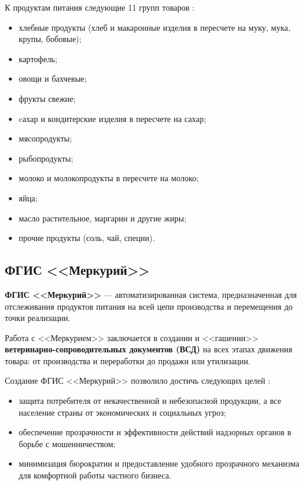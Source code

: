 \clearpage

К продуктам питания следующие 11 групп товаров \cite{info_consumer_basket2}:

\begin{itemize}[label=--]
	\item хлебные продукты (хлеб и макаронные изделия в пересчете на муку, мука, крупы, бобовые);
	\item картофель;
	\item овощи и бахчевые;
	\item фрукты свежие;
	\item cахар и кондитерские изделия в пересчете на сахар;
	\item мясопродукты;
	\item рыбопродукты;
	\item молоко и молокопродукты в пересчете на молоко;
	\item яйца;
	\item масло растительное, маргарин и другие жиры;
	\item прочие продукты (соль, чай, специи).
\end{itemize}

\subsection{ФГИС <<Меркурий>>}

\textbf{ФГИС <<Меркурий>>} --- автоматизированная система, предназначенная для отслеживания продуктов питания на всей цепи производства и перемещения до точки реализации.

Работа с <<Меркурием>> заключается в создании и <<гашении>> \textbf{ветеринарно-сопроводительных документов (ВСД)} на всех этапах движения товара: от производства и переработки до продажи или утилизации.

\clearpage

Создание ФГИС <<Меркурий>> позволило достичь следующих целей \cite{info_mercury, info_mercury2}:

\begin{itemize}[label=--]
	\item защита потребителя от некачественной и небезопасной продукции, а все население страны от экономических и социальных угроз;
	\item обеспечение прозрачности и эффективности действий надзорных органов в борьбе с мошенничеством;
	\item минимизация бюрократии и предоставление удобного прозрачного механизма для комфортной работы частного бизнеса.
\end{itemize}


